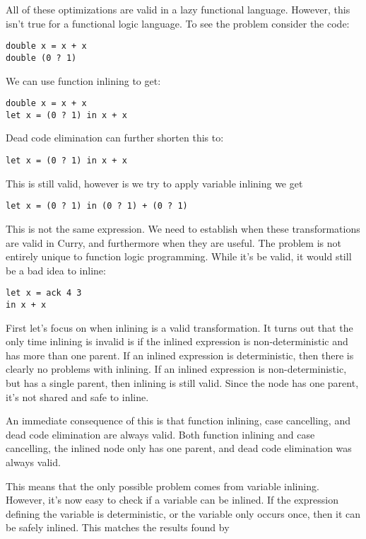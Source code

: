 \documentclass{article}
\begin{document}
All of these optimizations are valid in a lazy functional language.
However, this isn't true for a functional logic language.
To see the problem consider the code:

\begin{verbatim}
double x = x + x
double (0 ? 1)
\end{verbatim}

We can use function inlining to get:
\begin{verbatim}
double x = x + x
let x = (0 ? 1) in x + x
\end{verbatim}

Dead code elimination can further shorten this to:
\begin{verbatim}
let x = (0 ? 1) in x + x
\end{verbatim}

This is still valid, however is we try to apply variable inlining we get
\begin{verbatim}
let x = (0 ? 1) in (0 ? 1) + (0 ? 1)
\end{verbatim}

This is not the same expression.
We need to establish when these transformations are valid in Curry,
and furthermore when they are useful.
The problem is not entirely unique to function logic programming.
While it's be valid, it would still be a bad idea to inline:
\begin{verbatim}
let x = ack 4 3
in x + x
\end{verbatim}

First let's focus on when inlining is a valid transformation.
It turns out that the only time inlining is invalid is if 
the inlined expression is non-deterministic and has more than one parent.
If an inlined expression is deterministic, then there is clearly no problems with inlining.
If an inlined expression is non-deterministic, but has a single parent, then inlining is still valid.
Since the node has one parent, it's not shared and safe to inline.

An immediate consequence of this is that function inlining, case cancelling, and dead code elimination
are always valid.  Both function inlining and case cancelling, the inlined node only has one parent,
and dead code elimination was always valid.

This means that the only possible problem comes from variable inlining.
However, it's now easy to check if a variable can be inlined.
If the expression defining the variable is deterministic, or the variable only occurs once,
then it can be safely inlined.  This matches the results found by \cite{Inlining}
\end{document}
